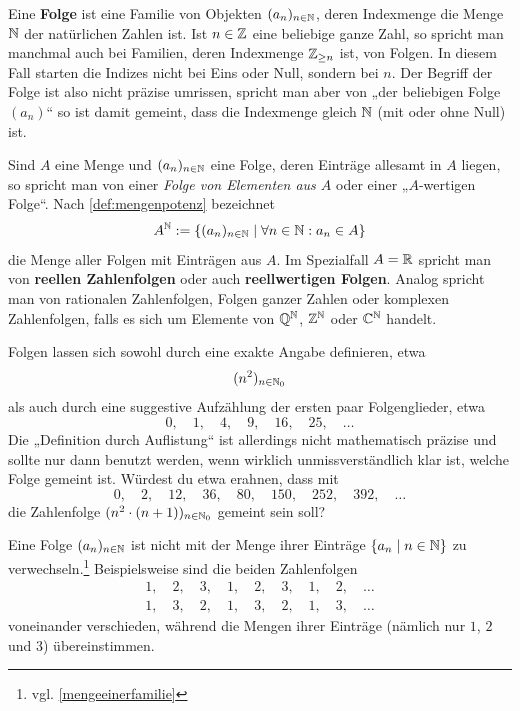 \begin{defin}[Folge] \label{def:folge} 
    Eine \textbf{Folge} ist eine Familie von Objekten $(a_n)_{n\in \mathbb N}$, deren Indexmenge die Menge $\mathbb N$ der natürlichen Zahlen ist. Ist $n\in \mathbb Z$ eine beliebige ganze Zahl, so spricht man manchmal auch bei Familien, deren Indexmenge $\mathbb Z_{\ge n}$ ist, von Folgen. In diesem Fall starten die Indizes nicht bei Eins oder Null, sondern bei $n$. Der Begriff der Folge ist also nicht präzise umrissen, spricht man aber von „der beliebigen Folge $(a_n)$“ so ist damit gemeint, dass die Indexmenge gleich $\mathbb N$ (mit oder ohne Null) ist.
    
    Sind $A$ eine Menge und $(a_n)_{n\in \mathbb N}$ eine Folge, deren Einträge allesamt in $A$ liegen, so spricht man von einer \emph{Folge von Elementen aus $A$} oder einer „$A$-wertigen Folge“. Nach \cref{def:mengenpotenz} bezeichnet
    \[ A^\mathbb N := \{ (a_n)_{n\in \mathbb N} \mid \forall n\in \mathbb N: a_n\in A \} \]
    die Menge aller Folgen mit Einträgen aus $A$. Im Spezialfall $A=\mathbb R$ spricht man von \textbf{reellen Zahlenfolgen} oder auch \textbf{reellwertigen Folgen}. Analog spricht man von rationalen Zahlenfolgen, Folgen ganzer Zahlen oder komplexen Zahlenfolgen, falls es sich um Elemente von $\mathbb Q^\mathbb N$, $\mathbb Z^\mathbb N$ oder $\mathbb C^\mathbb N$ handelt.
\end{defin}


\begin{nota}
    Folgen lassen sich sowohl durch eine exakte Angabe definieren, etwa
    \begin{align*}
        (n^2)_{n\in \mathbb N_0}
    \end{align*}
    als auch durch eine suggestive Aufzählung der ersten paar Folgenglieder, etwa
        \[ 0,\quad 1,\quad 4,\quad 9,\quad 16,\quad 25,\quad\dots \]
    Die „Definition durch Auflistung“ ist allerdings nicht mathematisch präzise und sollte nur dann benutzt werden, wenn wirklich unmissverständlich klar ist, welche Folge gemeint ist. Würdest du etwa erahnen, dass mit
        \[ 0,\quad 2,\quad 12,\quad 36,\quad 80,\quad 150,\quad 252,\quad 392,\quad \dots\]
    die Zahlenfolge $(n^2\cdot (n+1))_{n\in \mathbb N_0}$ gemeint sein soll?
\end{nota}


\begin{bem}
    Eine Folge $(a_n)_{n\in \mathbb N}$ ist nicht mit der Menge ihrer Einträge $\{a_n\mid n\in \mathbb N\}$ zu verwechseln.\footnote{vgl. \cref{mengeeinerfamilie}} Beispielsweise sind die beiden Zahlenfolgen
    \begin{align*}
        1,\quad 2,\quad 3,\quad 1,\quad 2,\quad 3,\quad 1,\quad 2,\quad \dots \\
        1,\quad 3,\quad 2,\quad 1,\quad 3,\quad 2,\quad 1,\quad 3,\quad \dots
    \end{align*}
    voneinander verschieden, während die Mengen ihrer Einträge (nämlich nur $1$, $2$ und $3$) übereinstimmen.
\end{bem}


